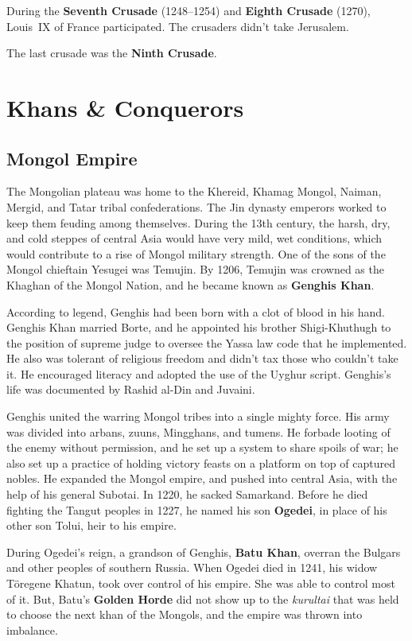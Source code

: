 During the \textbf{Seventh Crusade} (1248--1254) and \textbf{Eighth Crusade} (1270), Louis~IX of France participated.
The crusaders didn't take Jerusalem.

The last crusade was the \textbf{Ninth Crusade}.

\section{Khans \& Conquerors}

\subsection*{Mongol Empire}

The Mongolian plateau was home to the Khereid, Khamag Mongol, Naiman, Mergid, and Tatar tribal confederations.
The Jin dynasty emperors worked to keep them feuding among themselves.
During the 13th century, the harsh, dry, and cold steppes of central Asia would have very mild, wet conditions,
which would contribute to a rise of Mongol military strength.
One of the sons of the Mongol chieftain Yesugei was Temujin.
By 1206, Temujin was crowned as the Khaghan of the Mongol Nation,
and he became known as \textbf{Genghis Khan}.

According to legend, Genghis had been born with a clot of blood in his hand.
Genghis Khan married Borte,
and he appointed his brother Shigi-Khuthugh to the position of supreme judge
to oversee the Yassa law code that he implemented.
He also was tolerant of religious freedom and didn't tax those who couldn't take it.
He encouraged literacy and adopted the use of the Uyghur script.
Genghis's life was documented by Rashid al-Din and Juvaini.

Genghis united the warring Mongol tribes into a single mighty force.
His army was divided into arbans, zuuns, Mingghans, and tumens.
He forbade looting of the enemy without permission, and he set up a system to share spoils of war;
he also set up a practice of holding victory feasts on a platform on top of captured nobles.
He expanded the Mongol empire, and pushed into central Asia, with the help of his general Subotai.
In 1220, he sacked Samarkand.
Before he died fighting the Tangut peoples in 1227,
he named his son \textbf{Ogedei}, in place of his other son Tolui, heir to his empire.

During Ogedei's reign, a grandson of Genghis, \textbf{Batu Khan},
overran the Bulgars and other peoples of southern Russia.
When Ogedei died in 1241, his widow T\"oregene Khatun, took over control of his empire.
She was able to control most of it.
But, Batu's \textbf{Golden Horde} did not show up to the
\textit{kurultai} that was held to choose the next khan of the Mongols,
and the empire was thrown into imbalance.

